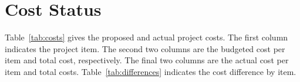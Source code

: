 \documentclass[12pt]{article}
\begin{document}
\section{Cost Status}
\label{sect::cost}

Table~\ref{tab:costs} gives the proposed and actual project costs. The first column indicates the project item. The second two columns are the budgeted cost per item and total cost, respectively. The final two columns are the actual cost per item and total costs. Table~\ref{tab:differences} indicates the cost difference by item. 
\end{document}
